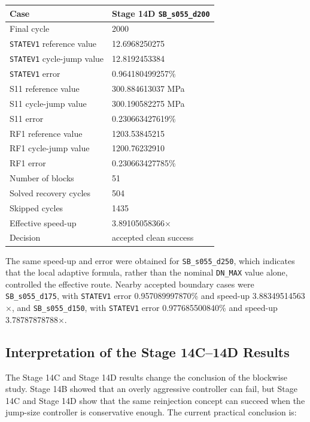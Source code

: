 \begin{center}
\begin{tabular}{ll}
\toprule
Case & Stage 14D \texttt{SB\_s055\_d200} \\
\midrule
Final cycle & 2000 \\
\texttt{STATEV1} reference value & 12.6968250275 \\
\texttt{STATEV1} cycle-jump value & 12.8192453384 \\
\texttt{STATEV1} error & 0.964180499257\% \\
S11 reference value & 300.884613037 MPa \\
S11 cycle-jump value & 300.190582275 MPa \\
S11 error & 0.230663427619\% \\
RF1 reference value & 1203.53845215 \\
RF1 cycle-jump value & 1200.76232910 \\
RF1 error & 0.230663427785\% \\
Number of blocks & 51 \\
Solved recovery cycles & 504 \\
Skipped cycles & 1435 \\
Effective speed-up & 3.89105058366$\times$ \\
Decision & accepted clean success \\
\bottomrule
\end{tabular}
\end{center}

The same speed-up and error were obtained for \texttt{SB\_s055\_d250}, which indicates that the local adaptive formula, rather than the nominal \texttt{DN\_MAX} value alone, controlled the effective route. Nearby accepted boundary cases were \texttt{SB\_s055\_d175}, with \texttt{STATEV1} error 0.957089997870\% and speed-up 3.88349514563$\times$, and \texttt{SB\_s055\_d150}, with \texttt{STATEV1} error 0.977685500840\% and speed-up 3.78787878788$\times$.

\subsection{Interpretation of the Stage 14C--14D Results}

The Stage 14C and Stage 14D results change the conclusion of the blockwise study. Stage 14B showed that an overly aggressive controller can fail, but Stage 14C and Stage 14D show that the same reinjection concept can succeed when the jump-size controller is conservative enough. The current practical conclusion is:

